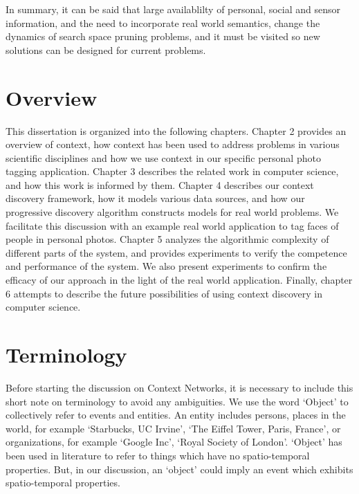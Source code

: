 In summary, it can be said that large availablilty of personal, social and sensor information, and the need to incorporate real world semantics, change the dynamics of search space pruning problems, and it must be visited so new solutions can be designed for current problems.

\section{Overview}
This dissertation is organized into the following chapters. Chapter 2 provides an overview of context, how context has been used to address problems in various scientific disciplines and how we use context in our specific personal photo tagging application. Chapter 3 describes the related work in computer science, and how this work is informed by them. Chapter 4 describes our context discovery framework, how it models various data sources, and how our progressive discovery algorithm constructs models for real world problems. We facilitate this discussion with an example real world application to tag faces of people in personal photos. Chapter 5 analyzes the algorithmic complexity of different parts of the system, and provides experiments to verify the competence and performance of the system. We also present experiments to confirm the efficacy of our approach in the light of the real world application. Finally, chapter 6 attempts to describe the future possibilities of using context discovery in computer science.


\section{Terminology}
Before starting the discussion on Context Networks, it is necessary to include this short note on terminology to avoid any ambiguities. We use the word `Object' to collectively refer to events and entities. An entity includes persons, places in the world, for example `Starbucks, UC Irvine', `The Eiffel Tower, Paris, France', or organizations, for example `Google Inc', `Royal Society of London'. `Object' has been used in literature to refer to things which have no spatio-temporal properties. But, in our discussion, an `object' could imply an event which exhibits spatio-temporal properties.

